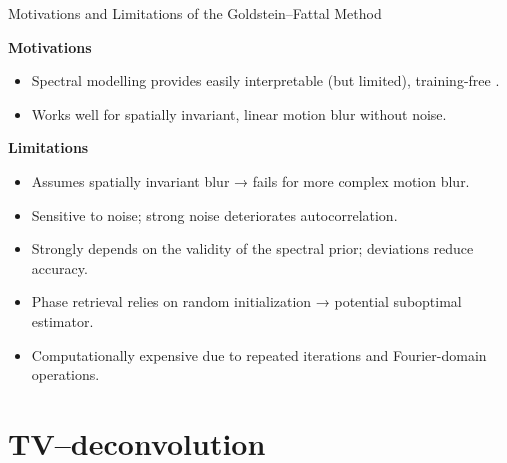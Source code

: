 \documentclass{beamer}
\begin{document}
\begin{frame}{Motivations and Limitations of the Goldstein--Fattal Method}

\textbf{Motivations}
\begin{itemize}
    \item Spectral modelling provides easily interpretable (but limited), training-free .
    \item Works well for spatially invariant, linear motion blur without noise.
\end{itemize}

\vspace{0.2cm}

\textbf{Limitations}
\begin{itemize}
    \item Assumes spatially invariant blur → fails for more complex motion blur.
    \item Sensitive to noise; strong noise deteriorates autocorrelation.
    \item Strongly depends on the validity of the spectral prior; deviations reduce accuracy.
    \item Phase retrieval relies on random initialization → potential suboptimal estimator.
    \item Computationally expensive due to repeated iterations and Fourier-domain operations.
\end{itemize}

\end{frame}




\section{TV–deconvolution}

\end{document}
